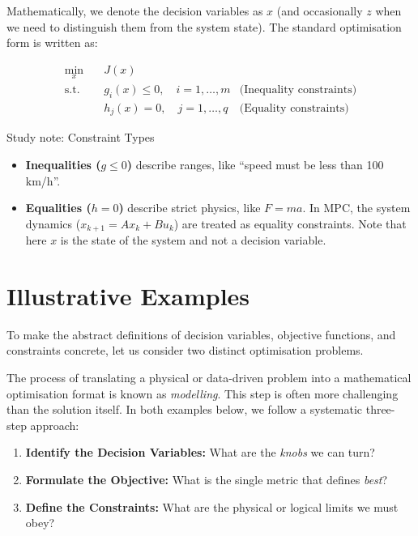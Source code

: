 Mathematically, we denote the decision variables as $x$ (and occasionally $z$ when we need to distinguish them from the system state). The standard optimisation form is written as:

\begin{equation}
	\begin{aligned}
		\min_{x} \quad & J (x) \\
		\text{s.t.} \quad & g_i(x) \leq 0, \quad i=1,\ldots,m & \text{(Inequality constraints)} \\
		& h_j(x) = 0, \quad j=1,\ldots,q & \text{(Equality constraints)}
	\end{aligned}
\end{equation}

\begin{notebox}{Study note: Constraint Types}
	\begin{itemize}
	\item \textbf{Inequalities ($g \le 0$)} describe ranges, like ``speed must be less than 100 km/h''. \\
	\item \textbf{Equalities ($h = 0$)} describe strict physics, like $F = ma$. In MPC, the system dynamics ($x_{k+1} = Ax_k + Bu_k$) are treated as equality constraints. Note that here $x$ is the state of the system and not a decision variable. 
	\end{itemize}
\end{notebox}

\section{Illustrative Examples}

To make the abstract definitions of decision variables, objective functions, and constraints concrete, let us consider two distinct optimisation problems.

The process of translating a physical or data-driven problem into a mathematical optimisation format is known as \emph{modelling}. This step is often more challenging than the solution itself. In both examples below, we follow a systematic three-step approach:
\begin{enumerate}
	\item \textbf{Identify the Decision Variables:} What are the \emph{knobs} we can turn?
	\item \textbf{Formulate the Objective:} What is the single metric that defines \emph{best}?
	\item \textbf{Define the Constraints:} What are the physical or logical limits we must obey?
\end{enumerate}

